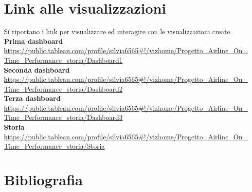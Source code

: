 \documentclass[12pt]{article}
\begin{document}
\newpage
\section{Link alle visualizzazioni}
Si riportano i link per visualizzare ed interagire con le visualizzazioni create.\smallskip\\
\textbf{Prima dashboard} \url{https://public.tableau.com/profile/silvia6565#!/vizhome/Progetto_Airline_On_Time_Performance_storia/Dashboard1}\smallskip\\
\textbf{Seconda dashboard} \url{https://public.tableau.com/profile/silvia6565#!/vizhome/Progetto_Airline_On_Time_Performance_storia/Dashboard2}\smallskip\\
\textbf{Terza dashboard} \url{https://public.tableau.com/profile/silvia6565#!/vizhome/Progetto_Airline_On_Time_Performance_storia/Dashboard3}\smallskip\\
\textbf{Storia} \url{https://public.tableau.com/profile/silvia6565#!/vizhome/Progetto_Airline_On_Time_Performance_storia/Storia}

\newpage
\section{Bibliografia}
\nocite{*}
\printbibliography[heading=none] %
\end{document}
